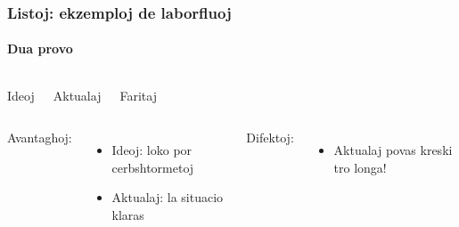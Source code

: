   \begin{frame}
    \frametitle{Listoj: ekzemploj de laborfluoj}
    \framesubtitle{Dua provo}
    
    	\begin{columns}
	    \begin{block}
	    
	    	Ideoj
	    
    	\end{block}
    	\begin{block}
    	
    		Aktualaj
    	
    	\end{block}
    	\begin{block}
    	
    		Faritaj
    		
    	\end{block}
    	
	\end{columns}
    \vspace{4em}
    	\begin{columns}
    Avantaghoj:
    \begin{itemize}
    		\item Ideoj: loko por cerbshtormetoj
    		\item Aktualaj: la situacio klaras
    \end{itemize}
	\column{0.5\textwidth}
    Difektoj:
    \begin{itemize}
    		\item Aktualaj povas kreski tro longa!
    \end{itemize}
    	
	\end{columns}
  \end{frame}




